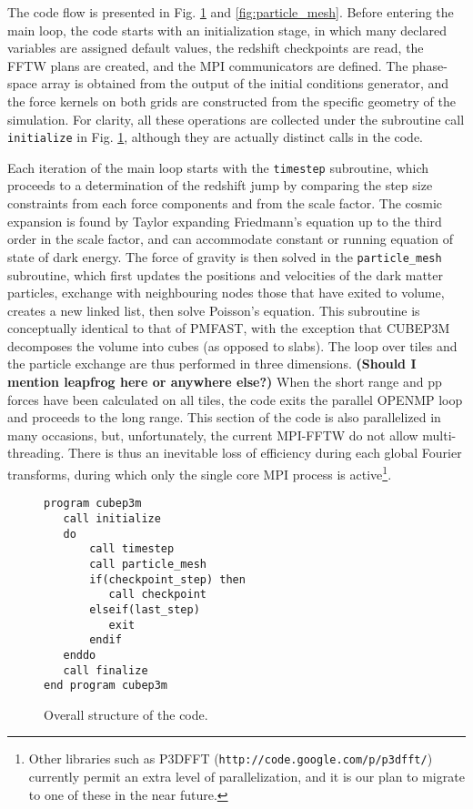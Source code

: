 The code flow is presented in Fig. \ref{fig:structure} and \ref{fig:particle_mesh}.
Before entering the main loop, the code starts with an initialization stage, 
in which many declared variables are assigned default values,
the redshift checkpoints are read, the {\small FFTW} plans are created, and the {\small MPI} communicators are defined.
The phase-space array  is obtained from the output of the initial conditions generator,
and the force kernels on both grids are constructed from the specific geometry of the simulation.
For clarity, all these operations are collected under the subroutine call {\tt initialize} in Fig. \ref{fig:structure}, 
although they are actually distinct calls in the code.

Each iteration of the main loop starts with the {\tt timestep} subroutine, 
which proceeds to a determination of the redshift jump by comparing the step size constraints from each
force components and from the scale factor.
The cosmic expansion is found by Taylor expanding Friedmann's equation up to the third order in the scale factor,
and can accommodate constant or running equation of state of dark energy.
The force of gravity is then solved  in the {\tt particle\_mesh} subroutine,
which first updates the positions and velocities of the dark matter particles, exchange with neighbouring nodes those that have exited to volume,
creates a new linked list, then solve Poisson's equation.  This subroutine is conceptually identical to that of {\small PMFAST}, 
with the exception  that {\small CUBEP3M} decomposes the volume into cubes (as opposed to slabs). 
The loop over tiles and the particle exchange are thus performed in three dimensions.
{\bf (Should I mention leapfrog here or anywhere else?)}
When the short range and pp forces have been calculated on all tiles, the code exits the parallel {\small OPENMP} loop
and proceeds to the long range. This section of the code is also parallelized in many occasions, but, unfortunately, the current {\small MPI-FFTW}
do not allow multi-threading. There is thus an inevitable loss of efficiency during each global Fourier transforms, during which
only the single core {\small MPI} process is active\footnote{Other libraries such as {\small P3DFFT} ({\tt http://code.google.com/p/p3dfft/}) currently permit
 an extra level of parallelization, and it is our plan to migrate to one of these in the near future.}.

\begin{figure}
\begin{verbatim}
program cubep3m
   call initialize
   do
       call timestep
       call particle_mesh
       if(checkpoint_step) then
          call checkpoint
       elseif(last_step)
          exit
       endif
   enddo
   call finalize
end program cubep3m
\end{verbatim}
\caption{Overall structure of the code.}
\label{fig:structure}
\end{figure}

